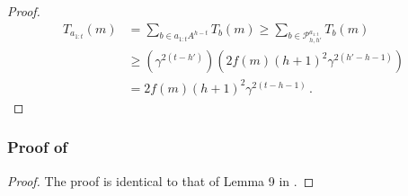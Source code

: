 \begin{subappendices}
\begin{proof}
	\begin{align*}
	T_{a_{1:t}}(m) &= \sum_{b\in a_{1:t}A^{h-t}} T_b(m) \geq \sum_{b\in \mathcal{P}^{a_{1:t}}_{h,h'}} T_b(m) \\
	&\geq \left(\gamma^{2(t-h')}\right) \left(2f(m)(h+1)^2\gamma^{2(h'-h-1)}\right)\\
	&= 2f(m)(h+1)^2\gamma^{2(t-h-1)}\,.\qquad\qquad
	\end{align*}
\end{proof}

\subsubsection{Proof of }

\begin{proof}
	The proof is identical to that of Lemma 9 in \citep{Bubeck2010}.
	

\end{proof}
\end{subappendices}
